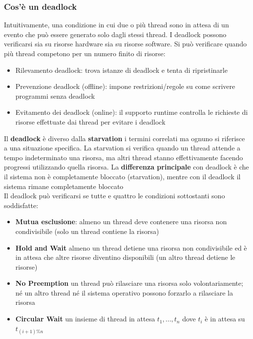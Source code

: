 \documentclass{article}
\begin{document}
\subsubsection{Cos'è un deadlock}
Intuitivamente, una condizione in cui due o più thread sono in attesa di un evento che può essere generato solo dagli stessi thread. I deadlock possono verificarsi sia su risorse hardware sia su risorse software. Si può verificare quando più thread competono per un numero finito di risorse:
\begin{itemize} 
    \item Rilevamento deadlock: trova istanze di deadlock e tenta di ripristinarle
    \item Prevenzione deadlock (offline): impone restrizioni/regole su come scrivere
    programmi senza deadlock
    \item Evitamento dei deadlock (online): il supporto runtime controlla le richieste di risorse effettuate dai thread per evitare i deadlock
\end{itemize}
Il \textbf{deadlock} è diverso dalla \textbf{starvation} i termini correlati ma ognuno si riferisce a una situazione specifica. La starvation si verifica quando un thread attende a tempo indeterminato una risorsa, ma altri thread stanno effettivamente facendo progressi utilizzando quella risorsa. La \textbf{differenza principale} con deadlock è che il sistema non è completamente bloccato (starvation), mentre con il deadlock il sistema rimane completamente bloccato \\

Il deadlock può verificarsi se tutte e quattro le condizioni sottostanti sono soddisfatte:
\begin{itemize}
    \item \textbf{Mutua esclusione}: almeno un thread deve contenere una risorsa non condivisibile (solo
    un thread contiene la risorsa)
    \item \textbf{Hold and Wait} almeno un thread detiene una risorsa non condivisibile ed è in attesa che altre risorse diventino disponibili (un altro thread detiene le risorse)
    \item \textbf{No Preemption} un thread può rilasciare una risorsa solo volontariamente; né un altro thread né il sistema operativo possono forzarlo a rilasciare la risorsa
    \item \textbf{Circular Wait} un insieme di thread in attesa $t_{1}, ..., t_{n}$ dove $t_{i}$ è in attesa su $t_{(i+1)\%n}$
\end{itemize}
\end{document}
